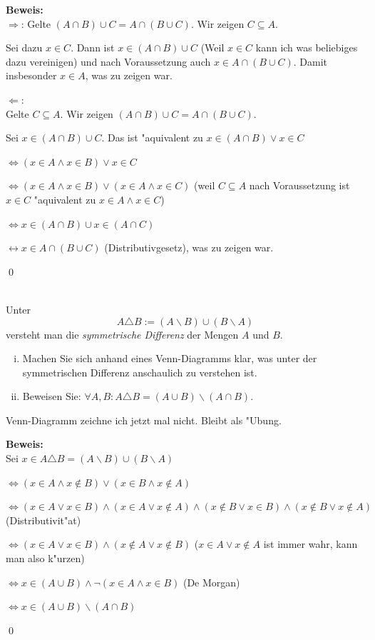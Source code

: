 \begin{loesung}
  \textbf{Beweis:}\\
\glqq $\Rightarrow$\grqq: Gelte $(A\cap B)\cup C=A\cap(B\cup C)$. Wir zeigen $C\subseteq A$.

Sei dazu $x\in C$. Dann ist $x\in (A\cap B)\cup C$ (Weil $x\in C$ kann ich was beliebiges dazu vereinigen) und nach Voraussetzung auch 
$x\in A\cap (B\cup C)$. Damit insbesonder $x\in A$, was zu zeigen war.

\glqq $\Leftarrow$\grqq:\\
Gelte $C\subseteq A$. Wir zeigen $(A\cap B)\cup C=A\cap(B\cup C)$.

Sei $x\in (A\cap B)\cup C$. Das ist "aquivalent zu $x\in (A\cap B)\vee x\in C$

$\Leftrightarrow (x\in A\wedge x\in B)\vee x\in C$

$\Leftrightarrow (x\in A\wedge x\in B)\vee (x\in A\wedge x\in C)$ (weil $C\subseteq A$ nach Voraussetzung ist $x\in C$ "aquivalent zu $x\in A\wedge x\in C$)

$\Leftrightarrow x\in (A\cap B)\cup x\in (A\cap C)$

$\leftrightarrow x\in A\cap(B\cup C)$ (Distributivgesetz), was zu zeigen war.

\qed

\end{loesung}

\\
  Unter 
  \[A\triangle B:=(A\backslash B)\cup (B\backslash A)\] versteht man die \textit{symmetrische Differenz} der Mengen $A$ und $B$.
  \begin{enumerate}[(i)]
    \item Machen Sie sich anhand eines Venn-Diagramms klar, was unter der symmetrischen Differenz anschaulich zu verstehen ist.
    \item Beweisen Sie: $\forall A,B:A\triangle B=(A\cup B)\backslash(A\cap B)$.
  \end{enumerate}

\begin{loesung}
Venn-Diagramm zeichne ich jetzt mal nicht. Bleibt als "Ubung.

\textbf{Beweis:}\\
Sei $x\in A\triangle B=(A\backslash B)\cup (B\backslash A)$

$\Leftrightarrow (x\in A\wedge x\notin B)\vee (x\in B\wedge x\notin A)$

$\Leftrightarrow (x\in A\vee x\in B)\wedge (x\in A\vee x\notin A)\wedge (x\notin B\vee x\in B)\wedge (x\notin B\vee x\notin A)$ (Distributivit"at)

$\Leftrightarrow (x\in A\vee x\in B)\wedge (x\notin A\vee x\notin B)$ ($x\in A\vee x\notin A$ ist immer wahr, kann man also k"urzen)

$\Leftrightarrow x\in (A\cup B)\wedge \neg (x\in A\wedge x\in B)$ (De Morgan)

$\Leftrightarrow x\in(A\cup B)\backslash(A\cap B)$

\qed
\end{loesung}

